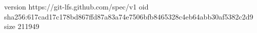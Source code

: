 version https://git-lfs.github.com/spec/v1
oid sha256:617cad17c178bd867ffd87a83a74e7506bfb8465328c4eb64abb30af5382c2d9
size 211949
